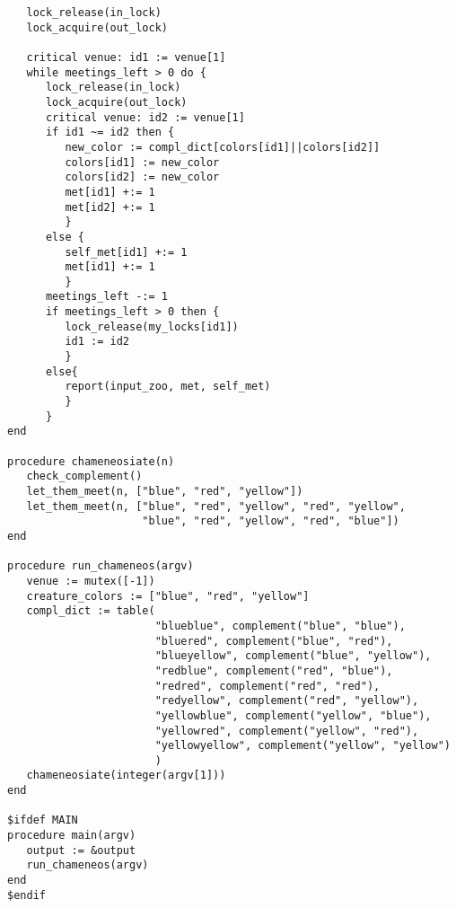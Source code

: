 \documentclass[letterpaper,12pt]{article}
\begin{document}
\begin{verbatim}
   lock_release(in_lock)  
   lock_acquire(out_lock) 
   
   critical venue: id1 := venue[1]
   while meetings_left > 0 do {
      lock_release(in_lock)
      lock_acquire(out_lock)
      critical venue: id2 := venue[1]
      if id1 ~= id2 then {
         new_color := compl_dict[colors[id1]||colors[id2]]
         colors[id1] := new_color
         colors[id2] := new_color
         met[id1] +:= 1
         met[id2] +:= 1
         }
      else {
         self_met[id1] +:= 1
         met[id1] +:= 1
         }
      meetings_left -:= 1
      if meetings_left > 0 then {
         lock_release(my_locks[id1])
         id1 := id2
         }
      else{
         report(input_zoo, met, self_met)
         }
      }
end

procedure chameneosiate(n)
   check_complement()
   let_them_meet(n, ["blue", "red", "yellow"])
   let_them_meet(n, ["blue", "red", "yellow", "red", "yellow",
                     "blue", "red", "yellow", "red", "blue"])
end

procedure run_chameneos(argv)
   venue := mutex([-1])
   creature_colors := ["blue", "red", "yellow"]
   compl_dict := table(
                       "blueblue", complement("blue", "blue"),
                       "bluered", complement("blue", "red"),
                       "blueyellow", complement("blue", "yellow"),
                       "redblue", complement("red", "blue"),
                       "redred", complement("red", "red"),
                       "redyellow", complement("red", "yellow"),
                       "yellowblue", complement("yellow", "blue"),
                       "yellowred", complement("yellow", "red"),
                       "yellowyellow", complement("yellow", "yellow")
                       )
   chameneosiate(integer(argv[1]))
end

$ifdef MAIN
procedure main(argv)
   output := &output
   run_chameneos(argv)
end
$endif

\end{verbatim}

\newpage
\end{document}
